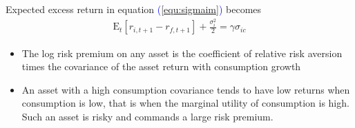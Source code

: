 \documentclass{beamer}
\begin{document}
\begin{frame}
	Expected excess return in equation \textcolor{blue}{(\ref{equ:sigmaim})} becomes
	\begin{align}\label{equ:consumption}
		\mathrm{E}_{t}\left[r_{i, t+1}-r_{f, t+1}\right]+\frac{\sigma_{i}^{2}}{2}=\gamma \sigma_{ic}
	\end{align}
\begin{itemize}
	\item The log risk premium on any asset is the coefficient of relative risk aversion times the covariance of the asset return with consumption growth
	\item An asset with a high consumption covariance tends to have low returns when consumption is low, that is when the marginal utility of consumption is high. Such an asset is risky and commands a large risk premium.
\end{itemize}
\end{frame}
\end{document}
